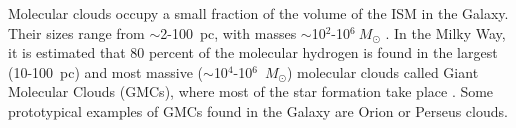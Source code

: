 \documentclass[12pt]{mythesis}
\begin{document}
Molecular clouds occupy a small fraction of the volume of the ISM in the Galaxy. Their sizes range from 
$\sim$2-100~pc,
with masses $\sim$10$^2$-10$^6~M_\odot$ \citep{williams2000, stahler2004, bergin2007, mckee2007, hennebelle2012}. 
In the Milky Way, it is estimated that 80 percent of the molecular hydrogen is found in the largest (10-100~pc) and most massive ($\sim$10$^4$-10$^6$~$M_\odot$) molecular clouds called Giant Molecular Clouds (GMCs), where most of the star formation take place \citep{dobbs2014, chevance2023}.
Some prototypical examples of GMCs found in the Galaxy are Orion or Perseus clouds.
\end{document}
